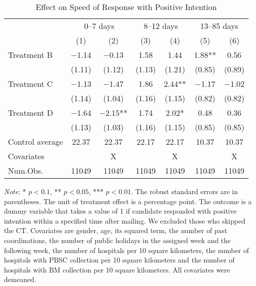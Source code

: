 \documentclass[12pt, a4paper]{article}
\begin{document}
\begin{table}[H]

\caption{\label{tab:lm-positive-time-decompose}Effect on Speed of Response with Positive Intention}
\centering
\fontsize{8}{10}\selectfont
\begin{threeparttable}
\begin{tabular}[t]{>{\raggedright\arraybackslash}p{20em}cccccc}
\toprule
\multicolumn{1}{c}{ } & \multicolumn{2}{c}{0--7 days} & \multicolumn{2}{c}{8--12 days} & \multicolumn{2}{c}{13--85 days} \\
\cmidrule(l{3pt}r{3pt}){2-3} \cmidrule(l{3pt}r{3pt}){4-5} \cmidrule(l{3pt}r{3pt}){6-7}
  & (1) & (2) & (3) & (4) & (5) & (6)\\
\midrule
Treatment B & \num{-1.14} & \num{-0.13} & \num{1.58} & \num{1.44} & \num{1.88}** & \num{0.56}\\
 & (\num{1.11}) & (\num{1.12}) & (\num{1.13}) & (\num{1.21}) & (\num{0.85}) & (\num{0.89})\\
Treatment C & \num{-1.13} & \num{-1.47} & \num{1.86} & \num{2.44}** & \num{-1.17} & \num{-1.02}\\
 & (\num{1.14}) & (\num{1.04}) & (\num{1.16}) & (\num{1.15}) & (\num{0.82}) & (\num{0.82})\\
Treatment D & \num{-1.64} & \num{-2.15}** & \num{1.74} & \num{2.02}* & \num{0.48} & \num{0.36}\\
 & (\num{1.13}) & (\num{1.03}) & (\num{1.16}) & (\num{1.15}) & (\num{0.85}) & (\num{0.85})\\
\midrule
Control average & 22.37 & 22.37 & 22.17 & 22.17 & 10.37 & 10.37\\
Covariates &  & X &  & X &  & X\\
Num.Obs. & \num{11049} & \num{11049} & \num{11049} & \num{11049} & \num{11049} & \num{11049}\\
\bottomrule
\end{tabular}
\begin{tablenotes}
\item \emph{Note}: * $p < 0.1$, ** $p < 0.05$, *** $p < 0.01$. The robust standard errors are in parentheses. The unit of treatment effect is a percentage point. The outcome is a dummy variable that takes a value of 1 if candidate responded with positive intention within a specified time after mailing. We excluded those who skipped the CT. Covariates are gender, age, its squared term, the number of past coordinations, the number of public holidays in the assigned week and the following week, the number of hospitals per 10 square kilometers, the number of hospitals with PBSC collection per 10 square kilometers and the number of hospitals with BM collection per 10 square kilometers. All covariates were demeaned.
\end{tablenotes}
\end{threeparttable}
\end{table}
\end{document}
